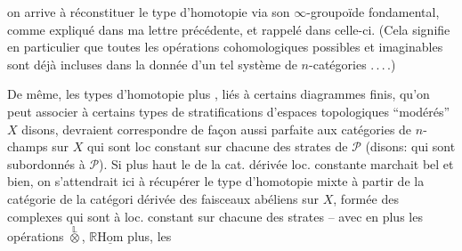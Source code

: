 on arrive à réconstituer le type d'homotopie via son $\infty$-groupoïde fondamental, comme expliqué dans ma lettre précédente, et rappelé dans celle-ci. (Cela signifie en particulier que toutes les opérations cohomologiques possibles et imaginables sont déjà incluses dans la donnée d'un tel système de $n$-catégories .\,.\,.\,.) 

De même, les types d'homotopie plus , liés à certains diagrammes finis, qu'on peut associer à certains types de stratifications  d'espaces topologiques ``modérés'' $X$ disons, devraient correspondre de façon aussi parfaite aux catégories de $n$-champs sur $X$ qui sont loc constant sur chacune des strates de $\mathcal{P}$ (disons: qui sont subordonnés à $\mathcal{P}$). Si plus haut le  de la cat. dérivée loc. constante marchait bel et bien, on s'attendrait ici à récupérer le type d'homotopie mixte à partir de la catégorie de la catégori dérivée des faisceaux abéliens sur $X$, formée des complexes qui sont à  loc. constant sur chacune des strates -- avec en plus les opérations $\overset{\mathbb{L}}{\otimes}$, $\mathbb{R}\underline{\mathrm{Hom}}$ plus, les
